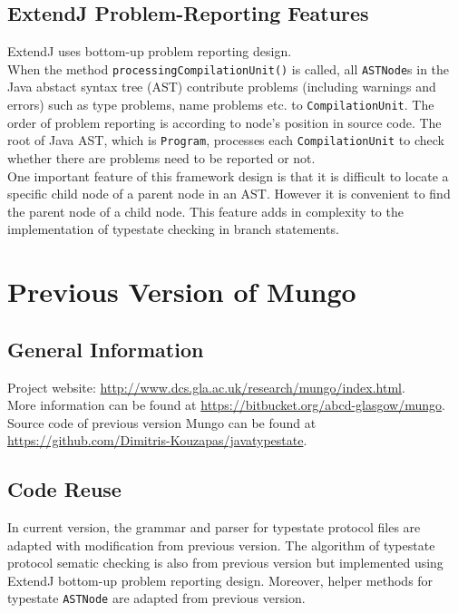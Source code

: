 \documentclass[]{article}
\begin{document}
\subsection{ExtendJ Problem-Reporting Features}
ExtendJ uses bottom-up problem reporting design. \\[0.2cm]
When the method \texttt{processingCompilationUnit()} is called, all \texttt{ASTNode}s in the Java abstact syntax tree (AST) contribute problems (including warnings and errors) such as type problems, name problems etc. to \texttt{CompilationUnit}. The order of problem reporting is according to node's position in source code. The root of Java AST, which is \texttt{Program}, processes each \texttt{CompilationUnit} to check whether there are problems need to be reported or not. \\[0.2cm]
One important feature of this framework design is that it is difficult to locate a specific child node of a parent node in an AST. However it is convenient to find the parent node of a child node. This feature adds in complexity to the implementation of typestate checking in branch statements.

\section{Previous Version of Mungo}
\subsection{General Information}
Project website: \url{http://www.dcs.gla.ac.uk/research/mungo/index.html}. \\[0.2cm]
More information can be found at \url{https://bitbucket.org/abcd-glasgow/mungo}. \\[0.2cm]
Source code of previous version Mungo can be found at \url{https://github.com/Dimitris-Kouzapas/javatypestate}.

\subsection{Code Reuse}
In current version, the grammar and parser for typestate protocol files are adapted with modification from previous version. The algorithm of typestate protocol sematic checking is also from previous version but implemented using ExtendJ bottom-up problem reporting design. Moreover, helper methods for typestate \texttt{ASTNode} are adapted from previous version.
\end{document}
